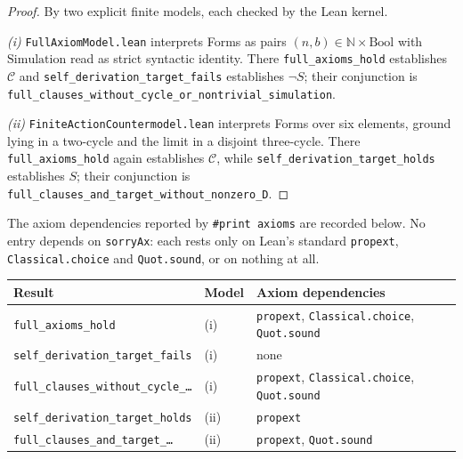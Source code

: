 \documentclass[11pt]{article}
\theoremstyle{definition}
\newcommand{\N}{\mathbb N}
\begin{document}
\begin{proof}
\sloppy
By two explicit finite models, each checked by the Lean kernel.

\emph{(i)} \texttt{FullAxiomModel.lean} interprets Forms as pairs $(n,b) \in \N \times \mathrm{Bool}$ with $\mathrm{Simulation}$ read as strict syntactic identity. There \texttt{full\_\allowbreak axioms\_\allowbreak hold} establishes $\mathcal{C}$ and \texttt{self\_\allowbreak derivation\_\allowbreak target\_\allowbreak fails} establishes $\neg S$; their conjunction is \texttt{full\_\allowbreak clauses\_\allowbreak without\_\allowbreak cycle\_\allowbreak or\_\allowbreak nontrivial\_\allowbreak simulation}.

\emph{(ii)} \texttt{FiniteAction\allowbreak Countermodel.lean} interprets Forms over six elements, ground lying in a two-cycle and the limit in a disjoint three-cycle. There \texttt{full\_\allowbreak axioms\_\allowbreak hold} again establishes $\mathcal{C}$, while \texttt{self\_\allowbreak derivation\_\allowbreak target\_\allowbreak holds} establishes $S$; their conjunction is \texttt{full\_\allowbreak clauses\_\allowbreak and\_\allowbreak target\_\allowbreak without\_\allowbreak nonzero\_\allowbreak D}.
\end{proof}

The axiom dependencies reported by \texttt{\#print axioms} are recorded below. No entry depends on \texttt{sorryAx}: each rests only on Lean's standard \texttt{propext}, \texttt{Classical.choice} and \texttt{Quot.sound}, or on nothing at all.

\begin{center}
\small
\begin{tabular}{lll}
\hline
Result & Model & Axiom dependencies \\
\hline
\texttt{full\_axioms\_hold} & (i) & \texttt{propext}, \texttt{Classical.choice}, \texttt{Quot.sound} \\
\texttt{self\_derivation\_target\_fails} & (i) & none \\
\texttt{full\_clauses\_without\_cycle\_\ldots} & (i) & \texttt{propext}, \texttt{Classical.choice}, \texttt{Quot.sound} \\
\texttt{self\_derivation\_target\_holds} & (ii) & \texttt{propext} \\
\texttt{full\_clauses\_and\_target\_\ldots} & (ii) & \texttt{propext}, \texttt{Quot.sound} \\
\hline
\end{tabular}
\end{center}
\end{document}
